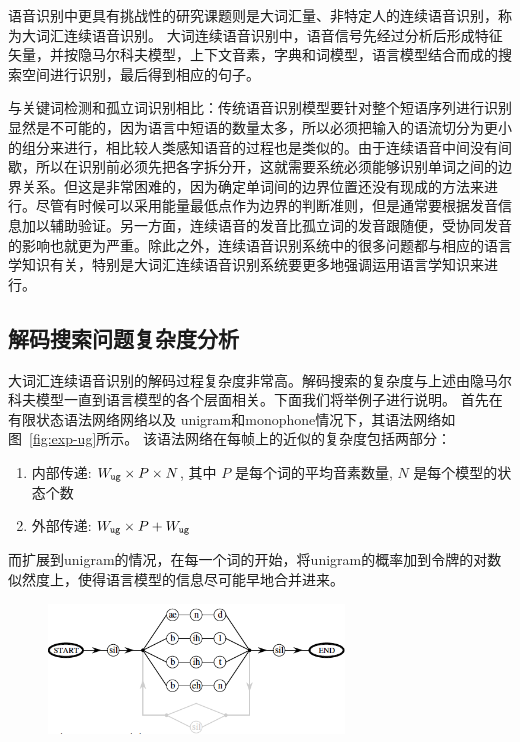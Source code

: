 语音识别中更具有挑战性的研究课题则是大词汇量、非特定人的连续语音识别，称为大词汇连续语音识别。
大词连续语音识别中，语音信号先经过分析后形成特征矢量，并按隐马尔科夫模型，上下文音素，字典和词模型，语言模型结合而成的搜索空间进行识别，最后得到相应的句子。

与关键词检测和孤立词识别相比：传统语音识别模型要针对整个短语序列进行识别显然是不可能的，因为语言中短语的数量太多，所以必须把输入的语流切分为更小的组分来进行，相比较人类感知语音的过程也是类似的。由于连续语音中间没有间歇，所以在识别前必须先把各字拆分开，这就需要系统必须能够识别单词之间的边界关系。但这是非常困难的，因为确定单词间的边界位置还没有现成的方法来进行。尽管有时候可以采用能量最低点作为边界的判断准则，但是通常要根据发音信息加以辅助验证。另一方面，连续语音的发音比孤立词的发音跟随便，受协同发音的影响也就更为严重。除此之外，连续语音识别系统中的很多问题都与相应的语言学知识有关，特别是大词汇连续语音识别系统要更多地强调运用语言学知识来进行。

\subsection{解码搜索问题复杂度分析}
\label{chap:intro-lvcsr-complex}

大词汇连续语音识别的解码过程复杂度非常高。解码搜索的复杂度与上述由隐马尔科夫模型一直到语言模型的各个层面相关。下面我们将举例子进行说明。
首先在有限状态语法网络网络以及 unigram和monophone情况下，其语法网络如图~\ref{fig:exp-ug}所示。
该语法网络在每帧上的近似的复杂度包括两部分：
\begin{enumerate}
\item 内部传递: $W_{\tt ug}\times P\times N$, 其中 $P$ 是每个词的平均音素数量, $N$ 是每个模型的状态个数
\item 外部传递: $W_{\tt ug}\times P + W_{\tt ug}$ 
\end{enumerate}
而扩展到unigram的情况，在每一个词的开始，将unigram的概率加到令牌的对数似然度上，使得语言模型的信息尽可能早地合并进来。

\begin{figure}[!htp]
  \centering
    \captionstyle{\centering}
    \includegraphics[clip=true, width=0.7\textwidth]{figure/ug.png}
\end{figure}

